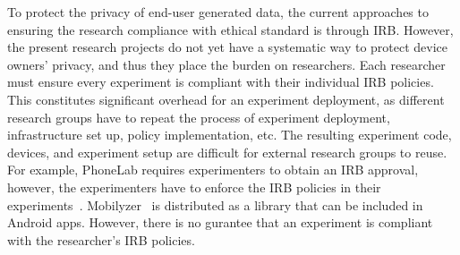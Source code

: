 To protect the privacy of end-user generated data, the 
current approaches to ensuring the research 
compliance with ethical standard is through IRB. However, 
the present research projects do not yet have a systematic 
way to protect device owners' privacy, and thus they place 
the burden on researchers. Each researcher must ensure every 
experiment is compliant with their individual IRB policies. 
This constitutes significant overhead for an experiment 
deployment, as different research groups have to repeat 
the process of experiment deployment, infrastructure 
set up, policy implementation, etc. The resulting 
experiment code, devices, and experiment setup are 
difficult for external research groups to reuse.
For example, PhoneLab requires experimenters to 
obtain an IRB approval, however, the experimenters have 
to enforce the IRB policies in their 
experiments~\cite{nandugudi2013phonelab}. 
Mobilyzer~\cite{nikravesh2015mobilyzer} is distributed 
as a library that can be included in Android apps. 
However, there is no gurantee that an 
experiment is compliant with the researcher's IRB policies.

